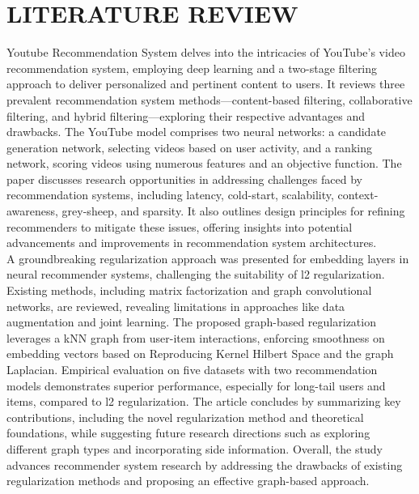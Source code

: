 \chapter{LITERATURE REVIEW}


Youtube Recommendation System\cite{davidson2010youtube} delves into the intricacies of YouTube's video recommendation system, employing deep learning and a two-stage filtering approach to deliver personalized and pertinent content to users. It reviews three prevalent recommendation system methods—content-based filtering, collaborative filtering, and hybrid filtering—exploring their respective advantages and drawbacks. The YouTube model comprises two neural networks: a candidate generation network, selecting videos based on user activity, and a ranking network, scoring videos using numerous features and an objective function. The paper discusses research opportunities in addressing challenges faced by recommendation systems, including latency, cold-start, scalability, context-awareness, grey-sheep, and sparsity. It also outlines design principles for refining recommenders to mitigate these issues, offering insights into potential advancements and improvements in recommendation system architectures.
\\
A groundbreaking regularization approach\cite{article2} was presented for embedding layers in neural recommender systems, challenging the suitability of l2 regularization. Existing methods, including matrix factorization and graph convolutional networks, are reviewed, revealing limitations in approaches like data augmentation and joint learning. The proposed graph-based regularization leverages a kNN graph from user-item interactions, enforcing smoothness on embedding vectors based on Reproducing Kernel Hilbert Space and the graph Laplacian. Empirical evaluation on five datasets with two recommendation models demonstrates superior performance, especially for long-tail users and items, compared to l2 regularization. The article concludes by summarizing key contributions, including the novel regularization method and theoretical foundations, while suggesting future research directions such as exploring different graph types and incorporating side information. Overall, the study advances recommender system research by addressing the drawbacks of existing regularization methods and proposing an effective graph-based approach.
\\
